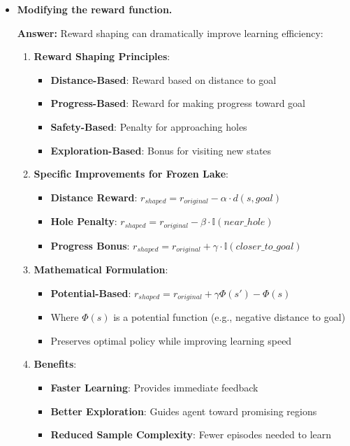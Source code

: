 \begin{itemize}
    \item \textbf{Modifying the reward function.}
    
    \textbf{Answer:} Reward shaping can dramatically improve learning efficiency:
    
    \begin{enumerate}
        \item \textbf{Reward Shaping Principles}:
        \begin{itemize}
            \item \textbf{Distance-Based}: Reward based on distance to goal
            \item \textbf{Progress-Based}: Reward for making progress toward goal
            \item \textbf{Safety-Based}: Penalty for approaching holes
            \item \textbf{Exploration-Based}: Bonus for visiting new states
        \end{itemize}
        
        \item \textbf{Specific Improvements for Frozen Lake}:
        \begin{itemize}
            \item \textbf{Distance Reward}: $r_{shaped} = r_{original} - \alpha \cdot d(s, goal)$
            \item \textbf{Hole Penalty}: $r_{shaped} = r_{original} - \beta \cdot \mathbb{I}(near\_hole)$
            \item \textbf{Progress Bonus}: $r_{shaped} = r_{original} + \gamma \cdot \mathbb{I}(closer\_to\_goal)$
        \end{itemize}
        
        \item \textbf{Mathematical Formulation}:
        \begin{itemize}
            \item \textbf{Potential-Based}: $r_{shaped} = r_{original} + \gamma \Phi(s') - \Phi(s)$
            \item Where $\Phi(s)$ is a potential function (e.g., negative distance to goal)
            \item Preserves optimal policy while improving learning speed
        \end{itemize}
        
        \item \textbf{Benefits}:
        \begin{itemize}
            \item \textbf{Faster Learning}: Provides immediate feedback
            \item \textbf{Better Exploration}: Guides agent toward promising regions
            \item \textbf{Reduced Sample Complexity}: Fewer episodes needed to learn
        \end{itemize}
        

\end{enumerate}
\end{itemize}

